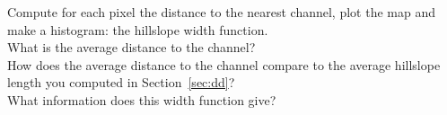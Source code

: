 \documentclass[twocolumn, 10pt, a4paper]{article}
\newenvironment{PC_prac_environment}{
\def\Q{\noindent \color{Gray}\rule[-0.1cm]{\columnwidth}{1.5pt}  \color{black} } \let\ques\Q 
\def\nQ{\noindent \color{black} } \let\ques\nQ 
\def\E{\color{Gray}\rule[0.3cm]{\columnwidth}{1.5pt} \color{black}} \let\ques\E }
\newcommand{\A}[2] { \ifthenelse{\boolean{showanswer}} {\noindent \color{cyan}{#2}\color{black}} {\multido{}{#1}{\noindent \color{light-gray}\hrulefill\\} } }
\begin{document}
\begin{PC_prac_environment}
Compute for each pixel the distance to the nearest channel, plot the map and make a histogram: the hillslope width function.\\
\Q What is the average distance to the channel?\\
\nQ How does the average distance to the channel compare to the average hillslope length you computed in Section~\ref{sec:dd}?\\
\nQ What information does this width function give?\\
\end{PC_prac_environment}
\end{document}
